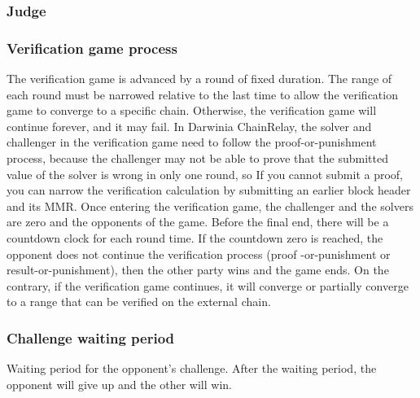 \subsubsection*{Judge} 



\subsubsection*{Verification game process} 

The verification game is advanced by a round of fixed duration. The range of each round must be narrowed relative to the last time to allow the verification game to converge to a specific chain. Otherwise, the verification game will continue forever, and it may fail. In Darwinia ChainRelay, the solver and challenger in the verification game need to follow the proof-or-punishment process, because the challenger may not be able to prove that the submitted value of the solver is wrong in only one round, so If you cannot submit a proof, you can narrow the verification calculation by submitting an earlier block header and its MMR. Once entering the verification game, the challenger and the solvers are zero and the opponents of the game. Before the final end, there will be a countdown clock for each round time. If the countdown zero is reached, the opponent does not continue the verification process (proof -or-punishment or result-or-punishment), then the other party wins and the game ends. On the contrary, if the verification game continues, it will converge or partially converge to a range that can be verified on the external chain.


\subsubsection*{Challenge waiting period} Waiting period for the opponent's challenge. After the waiting period, the opponent will give up and the other will win.


\newpage